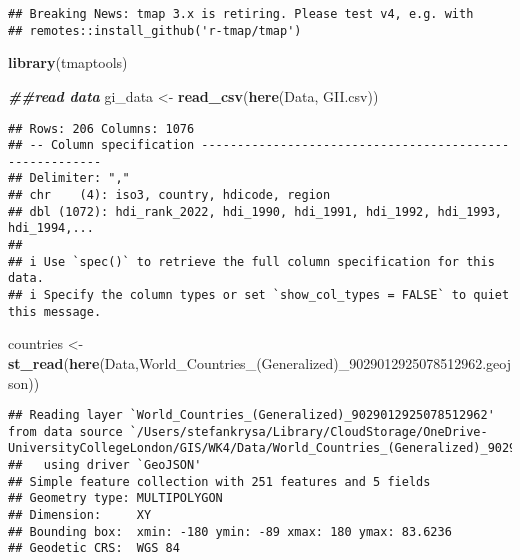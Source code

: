 \documentclass[
]{article}
\newenvironment{Shaded}{\begin{snugshade}}{\end{snugshade}}
\newcommand{\DocumentationTok}[1]{\textcolor[rgb]{0.56,0.35,0.01}{\textbf{\textit{#1}}}}
\newcommand{\FunctionTok}[1]{\textcolor[rgb]{0.13,0.29,0.53}{\textbf{#1}}}
\newcommand{\NormalTok}[1]{#1}
\newcommand{\OtherTok}[1]{\textcolor[rgb]{0.56,0.35,0.01}{#1}}
\newcommand{\StringTok}[1]{\textcolor[rgb]{0.31,0.60,0.02}{#1}}
\begin{document}
\begin{verbatim}
## Breaking News: tmap 3.x is retiring. Please test v4, e.g. with
## remotes::install_github('r-tmap/tmap')
\end{verbatim}

\begin{Shaded}
\begin{Highlighting}[]
\FunctionTok{library}\NormalTok{(tmaptools)}

\DocumentationTok{\#\#read data}
\NormalTok{gi\_data }\OtherTok{\textless{}{-}} \FunctionTok{read\_csv}\NormalTok{(}\FunctionTok{here}\NormalTok{(}\StringTok{\textquotesingle{}Data\textquotesingle{}}\NormalTok{, }\StringTok{\textquotesingle{}GII.csv\textquotesingle{}}\NormalTok{))}
\end{Highlighting}
\end{Shaded}

\begin{verbatim}
## Rows: 206 Columns: 1076
## -- Column specification --------------------------------------------------------
## Delimiter: ","
## chr    (4): iso3, country, hdicode, region
## dbl (1072): hdi_rank_2022, hdi_1990, hdi_1991, hdi_1992, hdi_1993, hdi_1994,...
## 
## i Use `spec()` to retrieve the full column specification for this data.
## i Specify the column types or set `show_col_types = FALSE` to quiet this message.
\end{verbatim}

\begin{Shaded}
\begin{Highlighting}[]
\NormalTok{countries }\OtherTok{\textless{}{-}} \FunctionTok{st\_read}\NormalTok{(}\FunctionTok{here}\NormalTok{(}\StringTok{\textquotesingle{}Data\textquotesingle{}}\NormalTok{,}\StringTok{\textquotesingle{}World\_Countries\_(Generalized)\_9029012925078512962.geojson\textquotesingle{}}\NormalTok{))}
\end{Highlighting}
\end{Shaded}

\begin{verbatim}
## Reading layer `World_Countries_(Generalized)_9029012925078512962' from data source `/Users/stefankrysa/Library/CloudStorage/OneDrive-UniversityCollegeLondon/GIS/WK4/Data/World_Countries_(Generalized)_9029012925078512962.geojson' 
##   using driver `GeoJSON'
## Simple feature collection with 251 features and 5 fields
## Geometry type: MULTIPOLYGON
## Dimension:     XY
## Bounding box:  xmin: -180 ymin: -89 xmax: 180 ymax: 83.6236
## Geodetic CRS:  WGS 84
\end{verbatim}
\end{document}
